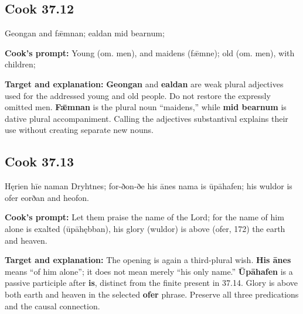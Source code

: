 \par\begin{minipage}{\linewidth}\raggedright
\subsection*{Cook 37.12}

Geongan and fǣmnan; ealdan mid bearnum;

\textbf{Cook's prompt:} Young (om. men), and maidens (fǣmne); old (om. men), with children;

\textbf{Target and explanation:} \textbf{Geongan} and \textbf{ealdan} are weak plural adjectives used for the addressed young and old people. Do not restore the expressly omitted men. \textbf{Fǣmnan} is the plural noun “maidens,” while \textbf{mid bearnum} is dative plural accompaniment. Calling the adjectives substantival explains their use without creating separate new nouns.

\end{minipage}\par\addvspace{4pt}

\par\begin{minipage}{\linewidth}\raggedright
\subsection*{Cook 37.13}

Hęrien hīe naman Dryhtnes; for-ðon-ðe his ānes nama is ūpāhafen; his wuldor is ofer eorðan and heofon.

\textbf{Cook's prompt:} Let them praise the name of the Lord; for the name of him alone is exalted (ūpāhębban), his glory (wuldor) is above (ofer, 172) the earth and heaven.

\textbf{Target and explanation:} The opening is again a third-plural wish. \textbf{His ānes} means “of him alone”; it does not mean merely “his only name.” \textbf{Ūpāhafen} is a passive participle after \textbf{is}, distinct from the finite present in 37.14. Glory is above both earth and heaven in the selected \textbf{ofer} phrase. Preserve all three predications and the causal connection.

\end{minipage}\par\addvspace{4pt}

